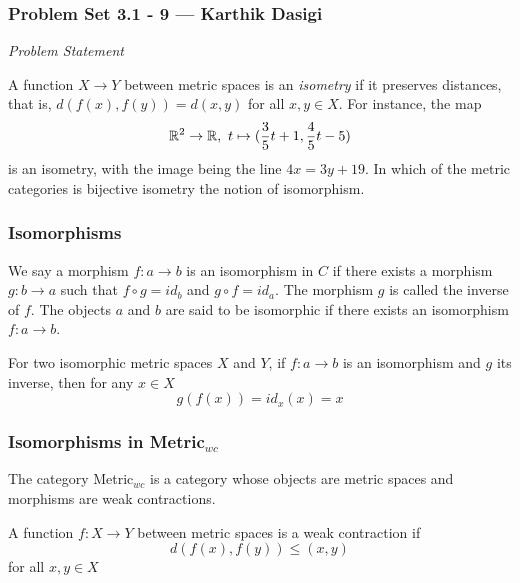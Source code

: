 
\begin{frame}
    \frametitle{Problem Set 3.1 - 9 --- Karthik Dasigi}
    \emph{Problem Statement}

    A function \(X\rightarrow Y\) between metric spaces is an \textit{isometry} if 
    it preserves distances, that is, \(d(f(x),f(y))=d(x,y)\) for all \(x,y \in X\).
    For instance, the map
    \begin{equation}
        \mathbb{R}^2 \rightarrow \mathbb{R} , \text{    } t \mapsto (\frac{3}{5}t+1, \frac{4}{5}t -5)
    \end{equation}
    is an isometry, with the image being the line \(4x =3y + 19\). 
    In which of the metric categories is bijective isometry the notion of isomorphism.
\end{frame}

\begin{frame}
    \frametitle{Isomorphisms}
    \begin{definition}[Isomorphism]
        We say a morphism \(f : a \rightarrow b\) is an isomorphism in \(C\) if there exists a morphism
        \(g : b \rightarrow a\) such that \(f \circ g = id_b\) and \(g \circ f = id_a\). The morphism \(g\) is called the inverse
        of \(f\). The objects \(a\) and \(b\) are said to be isomorphic if there exists an isomorphism \(f:a\rightarrow b\).
    \end{definition}
    \pause
    For two isomorphic metric spaces \(X\) and \(Y\), if \(f:a\rightarrow b\) is an isomorphism and \(g\) its inverse,
    then for any \(x\in X\)
    \begin{equation}
        g(f(x))=id_x(x)=x 
        \label{eqn:gfresult}
    \end{equation}
    
\end{frame}

\begin{frame}
    \frametitle{Isomorphisms in Metric\(_{wc}\)}
    The category Metric\(_{wc}\) is a category whose objects are metric spaces and morphisms are weak contractions.
    \pause
    \begin{definition}
        A function \(f : X \rightarrow Y\) between metric spaces is a
        weak contraction if
        \begin{equation}
            d(f(x),f(y))\leq (x,y)
            \label{eqn:wc}
        \end{equation}
        for all \(x,y\in X\)
    \end{definition}

\end{frame}

